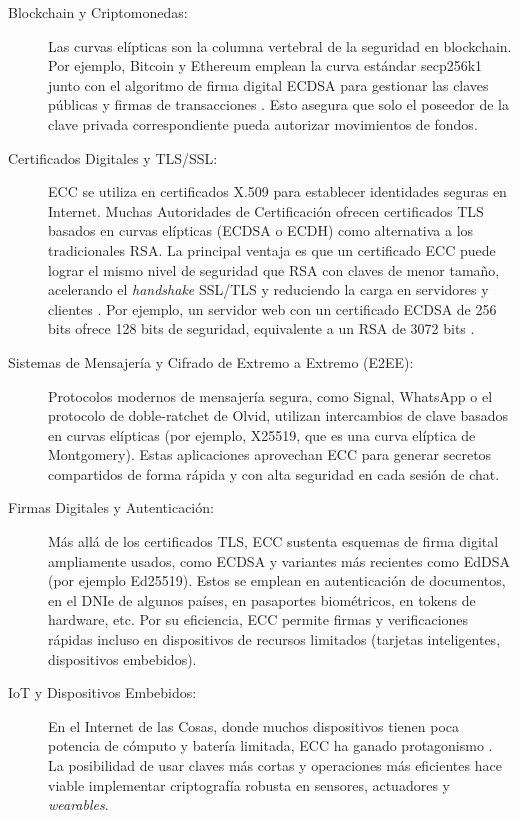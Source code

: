 \begin{description}
    \item[Blockchain y Criptomonedas:] Las curvas elípticas son la columna vertebral de la seguridad en blockchain. Por ejemplo, Bitcoin y Ethereum emplean la curva estándar secp256k1 junto con el algoritmo de firma digital ECDSA para gestionar las claves públicas y firmas de transacciones \cite{secp256k1-bitcoin}. Esto asegura que solo el poseedor de la clave privada correspondiente pueda autorizar movimientos de fondos.
    
    \item[Certificados Digitales y TLS/SSL:] ECC se utiliza en certificados X.509 para establecer identidades seguras en Internet. Muchas Autoridades de Certificación ofrecen certificados TLS basados en curvas elípticas (ECDSA o ECDH) como alternativa a los tradicionales RSA. La principal ventaja es que un certificado ECC puede lograr el mismo nivel de seguridad que RSA con claves de menor tamaño, acelerando el \textit{handshake} SSL/TLS y reduciendo la carga en servidores y clientes \cite{rfc4492,rfc5656}. Por ejemplo, un servidor web con un certificado ECDSA de 256 bits ofrece 128 bits de seguridad, equivalente a un RSA de 3072 bits \cite{hankerson2004guide}.
    
    \item[Sistemas de Mensajería y Cifrado de Extremo a Extremo (E2EE):] Protocolos modernos de mensajería segura, como Signal, WhatsApp o el protocolo de doble-ratchet de Olvid, utilizan intercambios de clave basados en curvas elípticas (por ejemplo, X25519, que es una curva elíptica de Montgomery). Estas aplicaciones aprovechan ECC para generar secretos compartidos de forma rápida y con alta seguridad en cada sesión de chat.
    
    \item[Firmas Digitales y Autenticación:] Más allá de los certificados TLS, ECC sustenta esquemas de firma digital ampliamente usados, como ECDSA y variantes más recientes como EdDSA (por ejemplo Ed25519). Estos se emplean en autenticación de documentos, en el DNIe de algunos países, en pasaportes biométricos, en tokens de hardware, etc. Por su eficiencia, ECC permite firmas y verificaciones rápidas incluso en dispositivos de recursos limitados (tarjetas inteligentes, dispositivos embebidos).
    
    \item[IoT y Dispositivos Embebidos:] En el Internet de las Cosas, donde muchos dispositivos tienen poca potencia de cómputo y batería limitada, ECC ha ganado protagonismo \cite{hodges2001ecc}. La posibilidad de usar claves más cortas y operaciones más eficientes hace viable implementar criptografía robusta en sensores, actuadores y \textit{wearables}.
\end{description}

